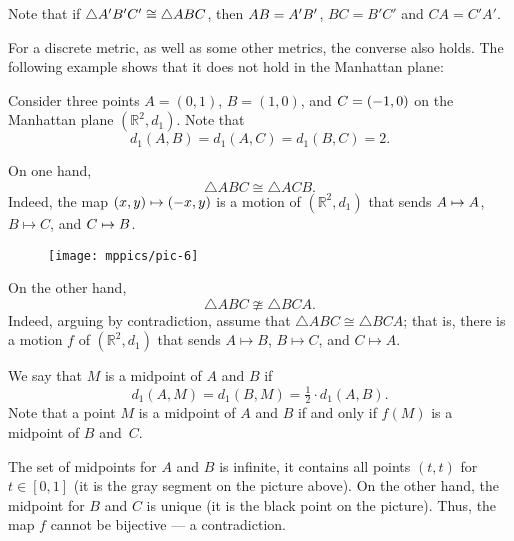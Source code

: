 Note that if $\triangle A' B' C'\z\cong\triangle A B C$,
then $AB\z=A'B'$,
$BC=B'C'$ and $CA=C'A'$.

For a discrete metric, as well as some other metrics, 
the converse also holds.
The following example shows that it does not hold in the Manhattan plane:

\label{example:isometric but not congruent} Consider three points 
$A=(0,1)$, $B=(1,0)$, and $C\z=(-1,0)$ on the Manhattan plane $(\mathbb{R}^2,d_1)$.
Note that
$$d_1(A,B)=d_1(A,C)=d_1(B,C)=2.$$

On one hand,
$$\triangle ABC\cong \triangle ACB.$$
Indeed, the map $(x,y)\z\mapsto (-x,y)$ is a motion of $(\mathbb{R}^2,d_1)$
that sends $A\z\mapsto A$, $B\mapsto C$, and $C\z\mapsto B$.

\begin{wrapfigure}[6]{o}{33mm}
\vskip-4mm
\centering
\texttt{[image: mppics/pic-6]}
\end{wrapfigure}

On the other hand,
$$\triangle ABC\ncong \triangle BCA.$$
Indeed, arguing by contradiction, assume that $\triangle ABC\cong \triangle BCA$; that is, there is a motion $f$ of $(\mathbb{R}^2,d_1)$ that sends $A\mapsto B$, $B\mapsto C$, and $C\mapsto A$.


We say that $M$ is a midpoint of $A$ and $B$ if 
\[d_1(A,M)=d_1(B,M)=\tfrac12\cdot d_1(A,B).\]
Note that a point $M$ is a midpoint of $A$ and $B$ if and only if $f(M)$ is a midpoint of $B$ and~$C$.

The set of midpoints for $A$ and $B$ is infinite, it contains all points $(t,t)$ for $t\in[0,1]$ (it is the gray segment on the picture above).
On the other hand, the midpoint for $B$ and $C$ is unique (it is the black point on the picture).
Thus, the map $f$ cannot be bijective --- a contradiction.

